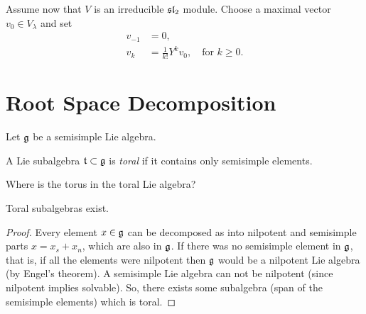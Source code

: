 Assume now that $V$ is an irreducible $\mathfrak{sl}_2$ module. Choose a maximal vector $v_0\in V_\lambda$ and set
\begin{align}
    v_{-1}&=0, \\
    v_k &= \frac{1}{k!} Y^k v_0, \quad\text{for } k\geq 0.
\end{align}


\section{Root Space Decomposition}
\label{sec:root_space_decomposition}

Let $\mathfrak{g}$ be a semisimple Lie algebra.

\begin{definition}
    A Lie subalgebra $\Lie t \subset \Lie g$ is \emph{toral} if it contains only semisimple elements.
\end{definition}

\begin{insight}
    Where is the torus in the toral Lie algebra? 
\end{insight}

\begin{lemma} 
    Toral subalgebras exist.
\end{lemma}
\begin{proof}
    Every element $x\in \mathfrak{g}$ can be decomposed as into nilpotent and semisimple parts $x=x_s + x_n$, which are also in $\mathfrak{g}$. 
    If there was no semisimple element in $\mathfrak{g}$, that is, if all the elements were nilpotent then $\mathfrak{g}$ would be a nilpotent Lie algebra (by Engel's theorem). A semisimple Lie algebra can not be nilpotent (since nilpotent implies solvable). So, there exists some subalgebra (span of the semisimple elements) which is toral.
\end{proof}

